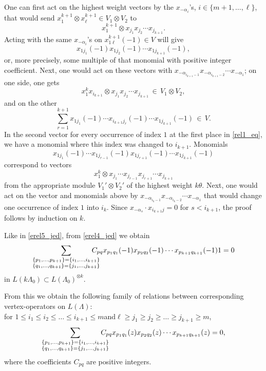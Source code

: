 \documentclass[a4paper, 10pt,oneside]{amsart}
\begin{document}
One can first act on the highest weight vectors by the
$x_{-\alpha_i}$'s, $i\in\{m+1,\dots,\ell\}$, that would send
$x_1^{k+1}\otimes x_\ell^{k+1}\in V_1\otimes V_2$ to
$$x_1^{k+1}\otimes x_{j_1} x_{j_2} \cdots x_{j_{k+1}}.$$ Acting with the same $x_{-\alpha_i}$'s on $x_{1\ell}^{k+1}(-1)\in V$
will give
\begin{equation}\label{rel1_eq}
x_{1 j_1}(-1) x_{1 j_2}(-1) \cdots x_{1 j_{k+1}}(-1),
\end{equation}
 or, more precisely, some multiple of that monomial with positive
integer coefficient.  Next, one would act
on these vectors with $x_{-\alpha_{i_{k+1}-1}}
x_{-\alpha_{i_{k+1}-2}} \cdots x_{-\alpha_1}$; on one side, one gets
$$x_1^{k} x_{i_{k+1}}\otimes
x_{j_1} x_{j_2} \cdots x_{j_{k+1}}\,\in \, V_1\otimes V_2,$$ and on
the other $$\sum_{r=1}^{k+1} x_{1 j_1}(-1) \cdots x_{i_{k+1} j_r}(-1)
\cdots x_{1 j_{k+1}}(-1)\,\in\, V.$$ In the second vector for every
occurrence of index $1$ at the first place in \eqref{rel1_eq}, we have a monomial where this index was
changed to $i_{k+1}$. Monomials
$$x_{1 j_1}(-1) \cdots x_{1 j_{r-1}}(-1) x_{1 j_{r+1}}(-1)\cdots x_{1 j_{k+1}}(-1)$$
correspond to vectors
$$x_1^k \otimes x_{j_1} \cdots x_{j_{r-1}}x_{j_{r+1}} \cdots
x_{j_{k+1}}$$ from the appropriate module $V_1'\otimes V_2'$ of
the highest weight $k \theta$. Next, one would act on the vector and monomials
above by $x_{-\alpha_{i_{k}-1}} x_{-\alpha_{i_{k}-2}} \cdots
x_{-\alpha_1}$ that would change one occurrence of index $1$ into
$i_k$. Since $x_{-\alpha_s}\cdot x_{i_{k+1} j}=0$ for $s<i_{k+1}$,
the proof follows by induction on $k$.

Like in \eqref{erel5_jed}, from \eqref{erel4_jed} we obtain
\begin{equation} 
\sum_{\substack{\{p_1,\dots,p_{k+1}\}=\{i_1,\dots,i_{k+1}\}
\\\{q_1,\dots,q_{k+1}\}=\{j_1,\dots,j_{k+1}\} }} \hspace{-3ex}
C_{pq} x_{p_1 q_1}(-1) x_{p_2 q_2}(-1) \cdots x_{p_{k+1}
q_{k+1}}(-1)1=0\end{equation}
in $L(k\Lambda_0)\subset L(\Lambda_0)^{\otimes k}.$

From this we obtain the following family of relations between corresponding vertex-operators on $L(\Lambda)$:\\ for  $1\leq
i_1 \leq i_2\leq\dots\leq i_{k+1}\leq m$\quad and\quad $\ell\geq j_1 \geq j_2\geq\dots\geq j_{k+1}\geq m$,
\begin{equation}
\label{Rel_jed}
\sum_{\substack{\{p_1,\dots,p_{k+1}\}=\{i_1,\dots,i_{k+1}\}
\\\{q_1,\dots,q_{k+1}\}=\{j_1,\dots,j_{k+1}\} }} \hspace{-3ex}
C_{pq} x_{p_1 q_1}(z)x_{p_2 q_2}(z)\cdots x_{p_{k+1}
q_{k+1}}(z)=0,
\end{equation}
 where the coefficients $C_{pq}$ are
positive integers.
\end{document}

